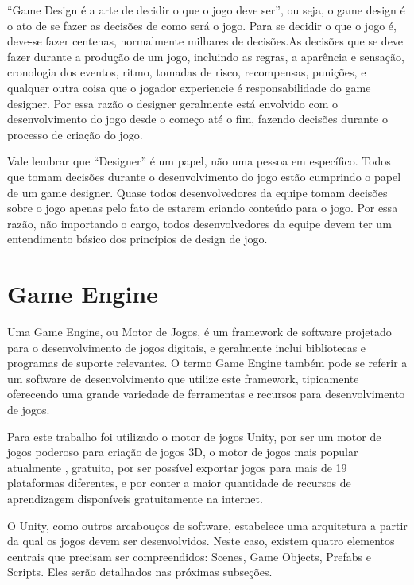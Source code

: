 “Game Design é a arte de decidir o que o jogo deve ser”, ou seja, o game design é o ato de se fazer as decisões de como será o jogo. Para se decidir o que o jogo é, deve-se fazer centenas, normalmente milhares de decisões.As decisões que se deve fazer durante a produção de um jogo, incluindo as regras, a aparência e sensação, cronologia dos eventos, ritmo, tomadas de risco, recompensas, punições, e qualquer outra coisa que o jogador experiencie é responsabilidade do game designer. Por essa razão o designer geralmente está envolvido com o desenvolvimento do jogo desde o começo até o fim, fazendo decisões durante o processo de criação do jogo. ~\cite{TheArt}

	Vale lembrar que “Designer” é um papel, não uma pessoa em específico. Todos que tomam decisões durante o desenvolvimento do jogo estão cumprindo o papel de um game designer. Quase todos desenvolvedores da equipe tomam decisões sobre o jogo apenas pelo fato de estarem criando conteúdo para o jogo. Por essa razão, não importando o cargo, todos desenvolvedores da equipe devem ter um entendimento básico dos princípios de design de jogo.~\cite{TheArt}

\section{Game Engine}\label{sec:engine}

Uma Game Engine, ou Motor de Jogos, é um framework de software projetado para 
o desenvolvimento de jogos digitais, e geralmente inclui bibliotecas e programas de suporte relevantes. O termo Game Engine também pode se referir a um software de desenvolvimento que utilize este framework, tipicamente oferecendo uma grande variedade de ferramentas e recursos para desenvolvimento de jogos.~\cite{Wiki03}

	Para este trabalho foi utilizado o motor de jogos Unity, por ser um motor de jogos poderoso para criação de jogos 3D, o motor de jogos mais popular atualmente \cite{GameDev:2021}, gratuito, por ser possível exportar jogos para mais de 19 plataformas diferentes, e por conter a maior quantidade de recursos de aprendizagem disponíveis gratuitamente na internet.
	
	O Unity, como outros arcabouços de software, estabelece uma arquitetura a partir da qual os jogos devem ser desenvolvidos. Neste caso, existem quatro elementos centrais que precisam ser compreendidos: Scenes, Game Objects, Prefabs e Scripts. Eles serão detalhados nas próximas subseções.

